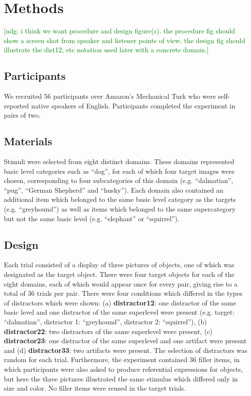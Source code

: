 \documentclass[10pt,letterpaper]{article}
\newcommand{\ndg}[1]{\textcolor{Green}{[ndg: #1]}}
\begin{document}
\section{\bf Methods}

\ndg{i think we want procedure and design figure(s). the procedure fig should show a screen shot from speaker and listener points of view. the design fig should illustrate the dist12, etc notation used later with a concrete domain.}

\subsection{\bf Participants}
We recruited 56 participants over Amazon's Mechanical Turk who were self-reported native speakers of English. Participants completed the experiment in pairs of two.

\subsection{\bf Materials}
Stimuli were selected from eight distinct domains. These domains represented basic level categories such as ``dog'', for each of which four target images were chosen, corresponding to four subcategories of this domain (e.g. ``dalmatian'', ``pug'', ``German Shepherd'' and ``husky''). Each domain also contained an additional item which belonged to the same basic level category as the targets (e.g. ``greyhound'') as well as items which belonged to the same supercategory but not the same basic level (e.g. ``elephant'' or ``squirrel''). 

\subsection{\bf Design}
Each trial consisted of a display of three pictures of objects, one of which was designated as the target object. There were four target objects for each of the eight domains, each of which would appear once for every pair, giving rise to a total of 36 trials per pair. There were four conditions which differed in the types of distractors which were shown: (a) {\bf distractor12}: one distractor of the same basic level and one distractor of the same superlevel were present (e.g. target: ``dalmatian'', distractor 1: ``greyhound'', distractor 2: ``squirrel''), (b) {\bf distractor22}: two distractors of the same superlevel were present, (c) {\bf distractor23}: one distractor of the same superlevel and one artifact were present and (d) {\bf distractor33}: two artifacts were present. The selection of distractors was random for each trial. Furthermore, the experiment contained 36 filler items, in which participants were also asked to produce referential expressions for objects, but here the three pictures illustrated the same stimulus which differed only in size and color. No filler items were reused in the target trials.
\end{document}
